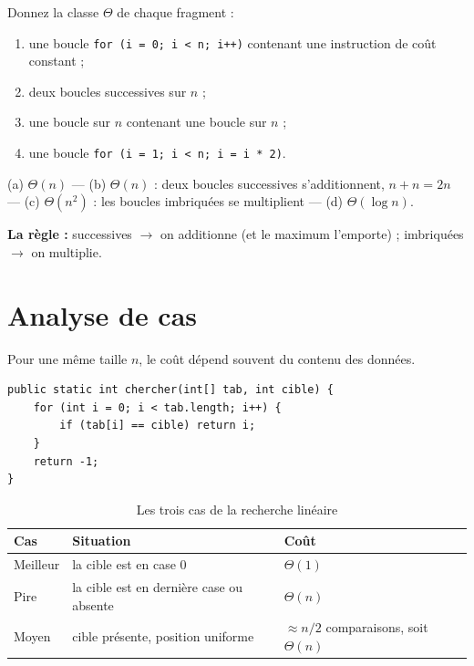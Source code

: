 \documentclass[11pt,a4paper]{article}
\newcommand{\bigTheta}{\Theta}
\theoremstyle{definition}
\theoremstyle{remark}
\begin{document}
\begin{appliboxQ}
Donnez la classe $\bigTheta$ de chaque fragment :
\begin{enumerate}[nosep,label=(\alph*)]
    \item une boucle \texttt{for (i = 0; i < n; i++)} contenant une
          instruction de coût constant ;
    \item deux boucles successives sur $n$ ;
    \item une boucle sur $n$ contenant une boucle sur $n$ ;
    \item une boucle \texttt{for (i = 1; i < n; i = i * 2)}.
\end{enumerate}
\end{appliboxQ}

\begin{appliboxR}[Réponse]
(a) $\bigTheta(n)$ --- (b) $\bigTheta(n)$ : deux boucles successives
s'additionnent, $n + n = 2n$ --- (c) $\bigTheta(n^2)$ : les boucles
imbriquées se multiplient --- (d) $\bigTheta(\log n)$.

\textbf{La règle :} successives $\rightarrow$ on additionne (et le maximum
l'emporte) ; imbriquées $\rightarrow$ on multiplie.
\end{appliboxR}

\section{Analyse de cas}

Pour une même taille $n$, le coût dépend souvent du contenu des données.

\begin{lstlisting}[caption={Recherche linéaire}]
public static int chercher(int[] tab, int cible) {
    for (int i = 0; i < tab.length; i++) {
        if (tab[i] == cible) return i;
    }
    return -1;
}
\end{lstlisting}

\begin{table}[h!]
\centering
\caption{Les trois cas de la recherche linéaire}
\begin{tabular}{lll}
\toprule
\textbf{Cas} & \textbf{Situation} & \textbf{Coût} \\
\midrule
Meilleur & la cible est en case $0$ & $\bigTheta(1)$ \\
Pire & la cible est en dernière case ou absente & $\bigTheta(n)$ \\
Moyen & cible présente, position uniforme & $\approx n/2$ comparaisons, soit $\bigTheta(n)$ \\
\bottomrule
\end{tabular}
\end{table}
\end{document}

